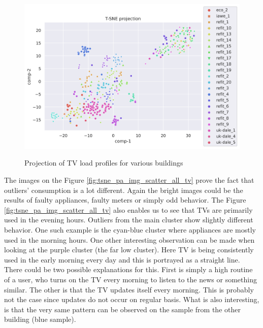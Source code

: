 \begin{figure}[H]
	\centering
	\caption{Projection of TV load profiles for various buildings}
	\includegraphics[width=1.2\textwidth]{Figures/TSNE/TSNE_per_appliance/all/scatter_all_television.png}
	\label{fig:tsne_pa_scatter_all_tv}
\end{figure}

The images on the Figure \ref{fig:tsne_pa_img_scatter_all_tv} prove the fact that outliers' consumption is a lot different.
Again the bright images could be the results of faulty appliances, faulty meters or simply odd behavior.
The Figure \ref{fig:tsne_pa_img_scatter_all_tv} also enables us to see that TVs are primarily used 
in the evening hours. Outliers from the main cluster show slightly different behavior. One such 
example is the cyan-blue cluster where appliances are mostly used in the morning hours. 
One other interesting observation can be made when looking at the purple cluster (the far low cluster).
Here TV is being consistently used in the early morning every day and this is portrayed as a straight line.
There could be two possible explanations for this.
First is simply a high routine of a user, who turns on the TV every morning to listen to the news or something similar.
The other is that the TV updates itself every morning. This is probably not the case since updates do not occur on regular basis.
What is also interesting, is that the very same pattern can be observed on the sample from the other building (blue sample).

